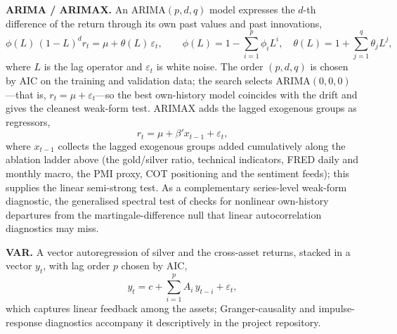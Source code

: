 \documentclass[12pt, a4paper]{article}
\begin{document}
\textbf{ARIMA / ARIMAX.} An \(\mathrm{ARIMA}(p,d,q)\) model expresses the \(d\)-th difference
of the return through its own past values and past innovations,
\begin{equation}
    \phi(L)\,(1-L)^d r_t = \mu + \theta(L)\,\varepsilon_t, \qquad
    \phi(L) = 1 - \sum_{i=1}^{p}\phi_i L^i, \quad
    \theta(L) = 1 + \sum_{j=1}^{q}\theta_j L^j ,
\end{equation}
where \(L\) is the lag operator and \(\varepsilon_t\) is white noise. The order \((p,d,q)\) is
chosen by AIC on the training and validation data; the search selects \(\mathrm{ARIMA}(0,0,0)\)
---that is, \(r_t = \mu + \varepsilon_t\)---so the best own-history model coincides with the
drift and gives the cleanest weak-form test. ARIMAX adds the lagged exogenous groups as
regressors,
\begin{equation}
    r_t = \mu + \beta' x_{t-1} + \varepsilon_t ,
\end{equation}
where \(x_{t-1}\) collects the lagged exogenous groups added cumulatively along the ablation
ladder above (the gold/silver ratio, technical indicators, FRED daily and monthly macro, the
PMI proxy, COT positioning and the sentiment feeds); this supplies the linear semi-strong test.
As a complementary series-level weak-form diagnostic, the generalised
spectral test of \textcite{hong2003} checks for nonlinear own-history departures from
the martingale-difference null that linear autocorrelation diagnostics may miss.

\textbf{VAR.} A vector autoregression of silver and the cross-asset returns, stacked in a
vector \(y_t\), with lag order \(p\) chosen by AIC,
\begin{equation}
    y_t = c + \sum_{i=1}^{p} A_i\, y_{t-i} + \varepsilon_t ,
\end{equation}
which captures linear feedback among the assets; Granger-causality and impulse-response
diagnostics accompany it descriptively in the project repository.
\end{document}
